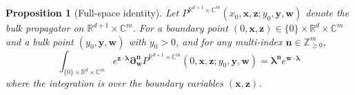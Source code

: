 \documentclass[11pt]{article}
\newcommand{\C}{\mathbb{C}}
\newcommand{\R}{\mathbb{R}}
\newcommand{\Z}{\mathbb{Z}}
\numberwithin{equation}{section}
\newtheorem{prop}{Proposition}[section]
\begin{document}
\begin{prop}[Full-space identity]\label{prop:full_space}
Let $P^{\R^{d+1}\times\C^m}(x_0,\boldsymbol{x},\boldsymbol{z};y_0,\boldsymbol{y},\boldsymbol{w})$ denote the bulk propagator on $\R^{d+1}\times\C^m$. For a boundary point $(0,\boldsymbol{x},\boldsymbol{z}) \in \{0\}\times\R^d\times\C^m$ and a bulk point $(y_0,\boldsymbol{y},\boldsymbol{w})$ with $y_0 > 0$, and for any multi-index $\boldsymbol{n} \in \Z_{\geq 0}^m$,
\begin{equation}\label{eq:full_space_identity}
	\int_{\{0\}\times\R^d \times \C^m}  e^{\boldsymbol{z}\cdot\boldsymbol{\lambda}}\boldsymbol{\partial}_{\boldsymbol{w}}^{\boldsymbol{n}}P^{\R^{d+1}\times\C^m}(0,\boldsymbol{x},\boldsymbol{z};y_0,\boldsymbol{y},\boldsymbol{w}) = \boldsymbol{\lambda}^{\boldsymbol{n}} e^{\boldsymbol{w}\cdot\boldsymbol{\lambda}}
\end{equation}
where the integration is over the boundary variables $(\boldsymbol{x},\boldsymbol{z})$.
\end{prop}
\end{document}

